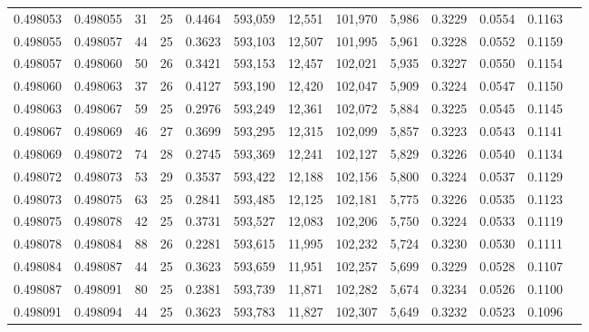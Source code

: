 \begin{tabular}{rrrrrrrrrrrrr}
0.498053 & 0.498055 &  31 &  25 &                                     0.4464 & 593,059 &  12,551 & 101,970 &   5,986 & 0.3229 & 0.0554 & 0.1163 \\
0.498055 & 0.498057 &  44 &  25 &                                     0.3623 & 593,103 &  12,507 & 101,995 &   5,961 & 0.3228 & 0.0552 & 0.1159 \\
0.498057 & 0.498060 &  50 &  26 &                                     0.3421 & 593,153 &  12,457 & 102,021 &   5,935 & 0.3227 & 0.0550 & 0.1154 \\
0.498060 & 0.498063 &  37 &  26 &                                     0.4127 & 593,190 &  12,420 & 102,047 &   5,909 & 0.3224 & 0.0547 & 0.1150 \\
0.498063 & 0.498067 &  59 &  25 &                                     0.2976 & 593,249 &  12,361 & 102,072 &   5,884 & 0.3225 & 0.0545 & 0.1145 \\
0.498067 & 0.498069 &  46 &  27 &                                     0.3699 & 593,295 &  12,315 & 102,099 &   5,857 & 0.3223 & 0.0543 & 0.1141 \\
0.498069 & 0.498072 &  74 &  28 &                                     0.2745 & 593,369 &  12,241 & 102,127 &   5,829 & 0.3226 & 0.0540 & 0.1134 \\
0.498072 & 0.498073 &  53 &  29 &                                     0.3537 & 593,422 &  12,188 & 102,156 &   5,800 & 0.3224 & 0.0537 & 0.1129 \\
0.498073 & 0.498075 &  63 &  25 &                                     0.2841 & 593,485 &  12,125 & 102,181 &   5,775 & 0.3226 & 0.0535 & 0.1123 \\
0.498075 & 0.498078 &  42 &  25 &                                     0.3731 & 593,527 &  12,083 & 102,206 &   5,750 & 0.3224 & 0.0533 & 0.1119 \\
0.498078 & 0.498084 &  88 &  26 &                                     0.2281 & 593,615 &  11,995 & 102,232 &   5,724 & 0.3230 & 0.0530 & 0.1111 \\
0.498084 & 0.498087 &  44 &  25 &                                     0.3623 & 593,659 &  11,951 & 102,257 &   5,699 & 0.3229 & 0.0528 & 0.1107 \\
0.498087 & 0.498091 &  80 &  25 &                                     0.2381 & 593,739 &  11,871 & 102,282 &   5,674 & 0.3234 & 0.0526 & 0.1100 \\
0.498091 & 0.498094 &  44 &  25 &                                     0.3623 & 593,783 &  11,827 & 102,307 &   5,649 & 0.3232 & 0.0523 & 0.1096 \\

\end{tabular}
